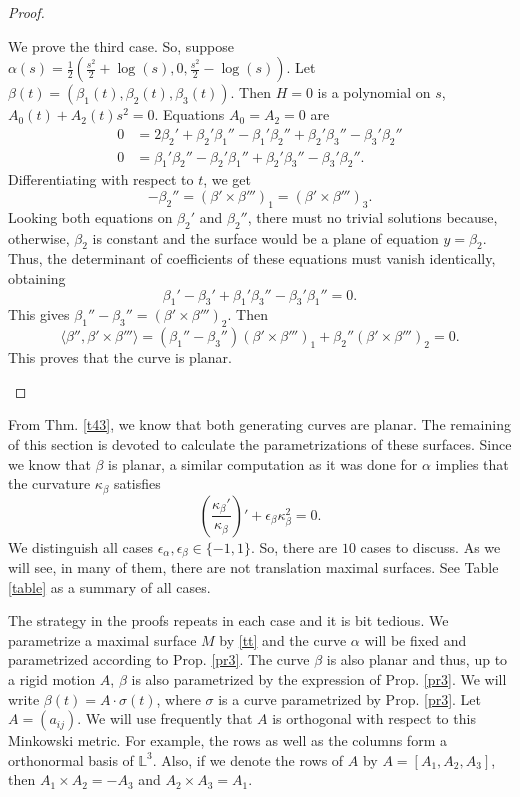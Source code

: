 \documentclass[a4paper,12pt]{amsart}
\numberwithin{equation}{section}
\theoremstyle{definition}
\def\rr{\mathbb L}
\begin{document}
\begin{proof}
\begin{enumerate}
We   prove the third case. So, suppose $\alpha(s)=\frac{1}{2}\left(\frac{s^2}{2}+\log(s),0, \frac{s^2}{2}-\log(s)\right)$.    Let $\beta(t)=(\beta_1(t),\beta_2(t),\beta_3(t))$. Then $H=0$ is a polynomial on $s$, $A_0(t)+A_2(t)s^2=0$. Equations $A_0=A_2=0$ are
\begin{equation*}
\begin{split}
0&=  2\beta_2'+\beta_2'\beta_1''-\beta_1'\beta_2''+\beta_2'\beta_3''-\beta_3'\beta_2''\\
0&=\beta_1'\beta_2''-\beta_2'\beta_1''+\beta_2'\beta_3''-\beta_3'\beta_2''.
\end{split}
\end{equation*}
Differentiating with respect to $t$, we get 
$$-\beta_2''=(\beta'\times\beta''')_1=(\beta'\times\beta''')_3.$$
Looking both equations on $\beta_2'$ and $\beta_2''$, there must no trivial solutions because, otherwise, $\beta_2$ is constant and the surface would be a plane of equation $y=\beta_2$. Thus, the determinant of coefficients of these equations must vanish identically, obtaining 
$$\beta_1'-\beta_3'+\beta_1'\beta_3''-\beta_3'\beta_1''=0.$$
This gives $\beta_1''-\beta_3''=(\beta'\times\beta''')_2$. Then
$$\langle \beta'',\beta'\times\beta'''\rangle=(\beta_1''-\beta_3'')(\beta'\times\beta''')_1+\beta_2'' (\beta'\times\beta''')_2 =0.$$
This proves that the curve is planar. 
 \end{enumerate}
\end{proof}

From Thm. \ref{t43}, we know that both generating curves are planar. The remaining of this section is devoted to calculate the parametrizations of these surfaces.  Since we know that $\beta$ is planar, a similar computation as it was done for $\alpha$ implies that the curvature $\kappa_\beta$ satisfies
$$\left(\frac{\kappa_\beta'}{\kappa_\beta}\right)'+\epsilon_\beta\kappa_\beta^2=0.$$
  We distinguish all cases $\epsilon_\alpha,\epsilon_\beta\in\{-1,1\}$. So, there are $10$ cases to discuss. As we will see, in many of them, there are not translation maximal surfaces. See Table \ref{table} as a summary of all cases.
  
  The strategy in the proofs  repeats in each case and it is bit tedious. We parametrize a maximal surface $M$ by \eqref{tt} and the curve $\alpha$ will be fixed and parametrized according to Prop. \ref{pr3}. The curve $\beta$ is also planar and thus, up to a rigid motion $A$, $\beta$ is also parametrized by the expression of  Prop. \ref{pr3}. We will write $\beta(t)=A\cdot\sigma(t)$, where $\sigma$ is a curve parametrized by Prop. \ref{pr3}. Let   $A=(a_{ij})$. We will use frequently that $A$ is orthogonal with respect to this Minkowski metric. For example,  the rows as well as the columns form a orthonormal basis of $\rr^3$. Also, if we denote the rows of  $A$ by   $A=[A_1,A_2,A_3]$, then $A_1\times A_2=-A_3$ and $A_2\times A_3=A_1$. 
\end{document}
